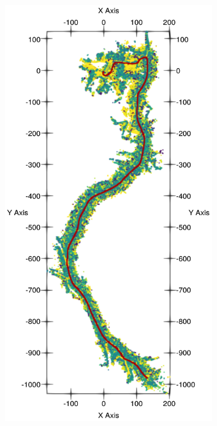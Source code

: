 \begin{figure}[htpb]
	\begin{center}
		\begin{subfigure}[b]{0.32\textwidth}
			\includegraphics[width=\linewidth]{figs/ltr_map_traj/path_a.pdf}

\end{subfigure}
\end{center}
\end{figure}
